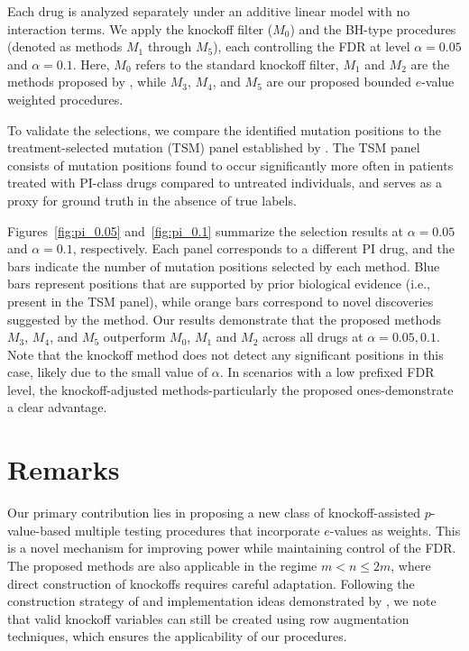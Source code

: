 \documentclass[11pt]{article}
\numberwithin{equation}{section}
\theoremstyle{plain}
\theoremstyle{remark}
\begin{document}
Each drug is analyzed separately under an additive linear model with no interaction terms. We apply the knockoff filter ($M_0$) and the BH-type procedures (denoted as methods $M_1$ through $M_5$), each controlling the FDR at level $\alpha = 0.05$ and $\alpha = 0.1$. Here, $M_0$ refers to the standard knockoff filter, $M_1$ and $M_2$ are the methods proposed by \citet{sarkar2022adjusting}, while $M_3$, $M_4$, and $M_5$ are our proposed bounded $e$-value weighted procedures.

To validate the selections, we compare the identified mutation positions to the treatment-selected mutation (TSM) panel established by \citet{rhee2005hiv}. The TSM panel consists of mutation positions found to occur significantly more often in patients treated with PI-class drugs compared to untreated individuals, and serves as a proxy for ground truth in the absence of true labels. 

Figures~\ref{fig:pi_0.05} and~\ref{fig:pi_0.1} summarize the selection results at $\alpha = 0.05$ and $\alpha = 0.1$, respectively. Each panel corresponds to a different PI drug, and the bars indicate the number of mutation positions selected by each method. Blue bars represent positions that are supported by prior biological evidence (i.e., present in the TSM panel), while orange bars correspond to novel discoveries suggested by the method. Our results demonstrate that the proposed methods $M_3$, $M_4$, and $M_5$ outperform $M_0$, $M_1$ and $M_2$ across all drugs at $\alpha = 0.05, 0.1$. Note that the knockoff method does not detect any significant positions in this case, likely due to the small value of $\alpha$. In scenarios with a low prefixed FDR level, the knockoff-adjusted methods-particularly the proposed ones-demonstrate a clear advantage.

\section{Remarks}

Our primary contribution lies in proposing a new class of knockoff-assisted $p$-value-based multiple testing procedures that incorporate $e$-values as weights. This is a novel mechanism for improving power while maintaining control of the FDR. The proposed methods are also applicable in the regime $m < n \leq 2m$, where direct construction of knockoffs requires careful adaptation. Following the construction strategy of \citet{barber2015controlling} and implementation ideas demonstrated by \citet{sarkar2022adjusting}, we note that valid knockoff variables can still be created using row augmentation techniques, which ensures the applicability of our procedures.
\end{document}
